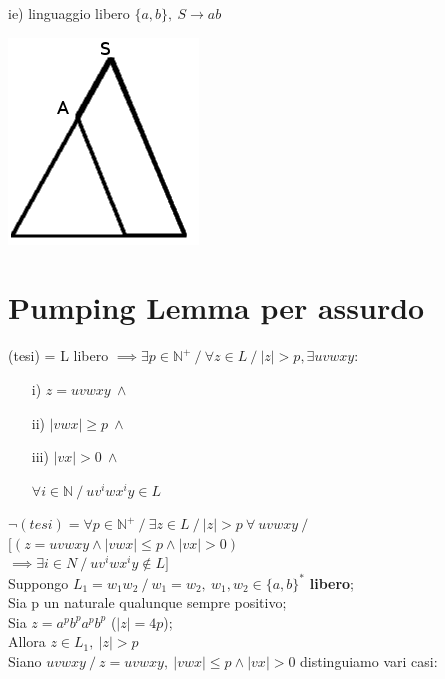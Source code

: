 ie) linguaggio libero $\{a,b\},\ S \rightarrow ab$ 
\begin{center}
\includegraphics[scale=0.4]{Chapters/Img/c01_04.png}
\end{center}


\section{Pumping Lemma per assurdo}
(tesi) = L libero $ \implies \exists p \in \mathbb{N}^+ \ / \ \forall z \in L \ / \ |z| > p,\exists u v w x y:$
\begin{itemize}
	\item[i)] 	$z = uvwxy\ \land$ \\
	\item[ii)] 	$|vwx| \geq p\ \land$ \\
	\item[iii)] $|vx| > 0 \ \land$ \\
	\item[ ] 	$\forall i \in \mathbb{N} \ / \ uv^iwx^iy \in L$\\
\end{itemize}
$\neg (tesi) = \forall p \in \mathbb{N}^+ \ / \ \exists z \in L \ / \ |z| > p\ \forall\ uvwxy \ / \ $
$[(z = uvwxy \land |vwx| \leq p \land |vx| > 0)$\\
$\implies \exists i \in N \ / \ uv^iwx^iy \not\in L]$\\[5pt]
Suppongo $L_1 = { w_1 w_2 \ / \ w_1 = w_2,\ w_1, w_2 \in \{a, b\}^*}$ \textbf{libero};\\
Sia p un naturale qualunque sempre positivo;\\
Sia $z = a^p b^p a^p b^p$ ($|z| = 4p$);\\
Allora $z \in L_1,\ |z| > p$\\
Siano $uvwxy \ / \ z=uvwxy,\ |vwx| \leq p \land |vx| > 0$ distinguiamo vari casi:

